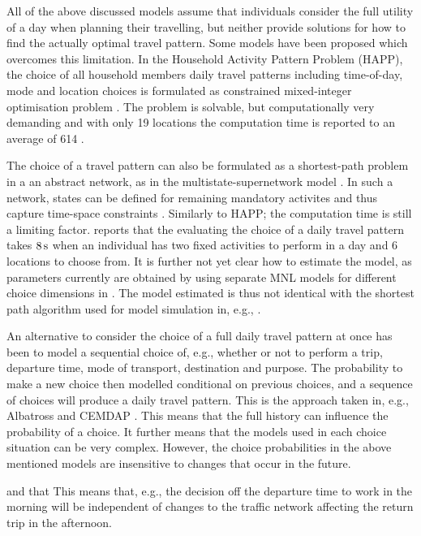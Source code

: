 All of the above discussed models assume that individuals consider the full utility of a day when planning their travelling, but neither provide solutions for how to find the actually optimal travel pattern. Some models have been proposed which overcomes this limitation. In the Household Activity Pattern Problem (HAPP), the choice of all household members daily travel patterns including time-of-day, mode and location choices is formulated as constrained mixed-integer optimisation problem \citep{Recker01,Recker08,Recker13,yuan2014HAPP}. The problem is solvable, but computationally very demanding and with only 19 locations the computation time is reported to an average of 614 \citep{Recker13}.

The choice of a travel pattern can also be formulated as a shortest-path problem in a an abstract network, as in the multistate-supernetwork model \citep{arentze04Multistate}. In such a network, states can be defined for remaining mandatory activites and thus capture time-space constraints \citep{liao2013incorporating} \citep{liao2016modeling}. Similarly to HAPP; the computation time is still a limiting factor. \citet{liao2016modeling} reports that the evaluating the choice of a daily travel pattern takes $8\, \mathrm{s}$ when an individual has two fixed activities to perform in a day and 6 locations to choose from. It is further not yet clear how to estimate the model, as parameters currently are obtained by using separate MNL models for different choice dimensions in \citet{Liao2017}. The model estimated is thus not identical  with the shortest path algorithm used for model simulation in, e.g., \citet{liao2016modeling}.

An alternative to consider the choice of a full daily travel pattern at once has been to model a sequential choice of, e.g., whether or not to perform a trip, departure time, mode of transport, destination and purpose. The probability to make a new choice then modelled conditional on previous choices, and a sequence of choices will produce a daily travel pattern. This is the approach taken in, e.g., Albatross \citet{timmermans2001modeling} and CEMDAP \citep{bhat04}. This means that the full history can influence the probability of a choice. It further means that the models used in each choice situation can be very complex. However, the choice probabilities in the above mentioned models are insensitive to changes that occur in the future.  

and that  This means that, e.g., the decision off the departure time to work in the morning will be independent of changes to the traffic network affecting the return trip in the afternoon. 


